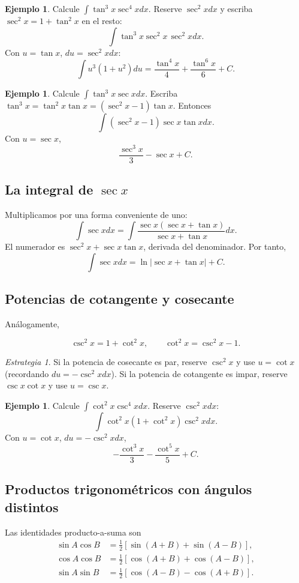 \documentclass[12pt]{article}
\theoremstyle{definition}
\newtheorem{ejemplo}[teorema]{Ejemplo}
\theoremstyle{remark}
\newtheorem*{estrategia}{Estrategia}
\begin{document}
\begin{ejemplo}Calcule $\int\tan^3x\sec^4x dx$. Reserve $\sec^2x dx$ y escriba $\sec^2x=1+\tan^2x$ en el resto:
\[\int\tan^3x\sec^2x\,\sec^2x dx.\]
Con $u=\tan x$, $du=\sec^2x dx$:
\[\int u^3(1+u^2)du=\boxed{\frac{\tan^4x}{4}+\frac{\tan^6x}{6}+C}.\]\end{ejemplo}

\begin{ejemplo}Calcule $\int\tan^3x\sec xdx$. Escriba $\tan^3x=\tan^2x\tan x=(\sec^2x-1)\tan x$. Entonces
\[\int(\sec^2x-1)\sec x\tan xdx.\]
Con $u=\sec x$,
\[\boxed{\frac{\sec^3x}{3}-\sec x+C}.\]\end{ejemplo}
\subsection*{La integral de $\sec x$}
Multiplicamos por una forma conveniente de uno:
\[\int\sec xdx=\int\frac{\sec x(\sec x+\tan x)}{\sec x+\tan x}dx.\]
El numerador es $\sec^2x+\sec x\tan x$, derivada del denominador. Por tanto,
\[\boxed{\int\sec xdx=\ln|\sec x+\tan x|+C}.\]
\subsection*{Potencias de cotangente y cosecante}
Análogamente,

\[\csc^2x=1+\cot^2x,\qquad\cot^2x=\csc^2x-1.\]

\begin{estrategia}Si la potencia de cosecante es par, reserve $\csc^2x$ y use $u=\cot x$ (recordando $du=-\csc^2x dx$). Si la potencia de cotangente es impar, reserve $\csc x\cot x$ y use $u=\csc x$.\end{estrategia}

\begin{ejemplo}Calcule $\int\cot^2x\csc^4x dx$. Reserve $\csc^2x dx$:
\[\int\cot^2x(1+\cot^2x)\csc^2x dx.\]
Con $u=\cot x$, $du=-\csc^2x dx$,
\[\boxed{-\frac{\cot^3x}{3}-\frac{\cot^5x}{5}+C}.\]\end{ejemplo}
\subsection*{Productos trigonométricos con ángulos distintos}
Las identidades producto-a-suma son
\begin{align*}
\sin A\cos B&=\tfrac12[\sin(A+B)+\sin(A-B)],\\
\cos A\cos B&=\tfrac12[\cos(A+B)+\cos(A-B)],\\
\sin A\sin B&=\tfrac12[\cos(A-B)-\cos(A+B)].
\end{align*}
\end{document}
